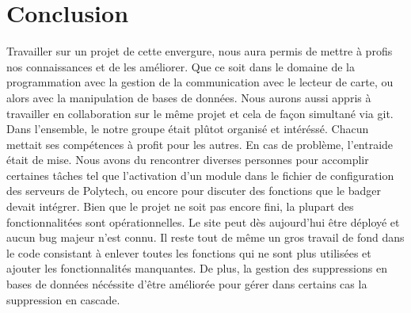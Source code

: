 \chapter{Conclusion}

Travailler sur un projet de cette envergure, nous aura permis de mettre à 
profis nos connaissances et de les améliorer. Que ce soit dans le domaine de la 
programmation avec la gestion de la communication avec le lecteur de carte, ou 
alors avec la manipulation de bases de données.
Nous aurons aussi appris à travailler en collaboration sur le même projet et cela de façon
simultané via git.
Dans l'ensemble, le notre groupe était plûtot organisé et intéréssé. Chacun 
mettait ses compétences à profit pour les autres. En cas de problème, l'entraide était de 
mise.
Nous avons du rencontrer diverses personnes pour accomplir certaines tâches tel que l'activation
d'un module dans le fichier de configuration des serveurs de Polytech, ou encore pour discuter des fonctions
que le badger devait intégrer.
Bien que le projet ne soit pas encore fini, la plupart des fonctionnalitées sont 
opérationnelles. Le site peut dès aujourd'hui être déployé et aucun bug majeur
 n'est connu. 
Il reste tout de même un gros travail de fond dans le code consistant à enlever toutes les fonctions 
qui ne sont plus utilisées et ajouter les fonctionnalités manquantes. De plus, la gestion des suppressions en bases de données 
nécéssite d'être améliorée pour gérer dans certains cas la suppression en cascade.


